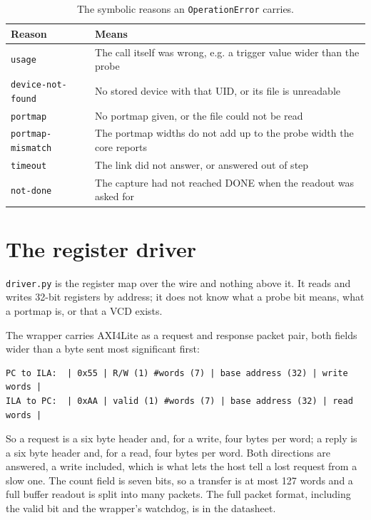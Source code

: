 \documentclass[../manual.tex]{subfiles}
\begin{document}
\begin{table}[H]
    \centering
    \begin{tabularx}{\textwidth}{|l|X|}
        \hline
        \rowcolor{gray!40} \textbf{Reason} & \textbf{Means} \\
        \hline
        \texttt{usage} & The call itself was wrong, e.g. a trigger value wider than the probe \\
        \hline
        \texttt{device-not-found} & No stored device with that UID, or its file is unreadable \\
        \hline
        \texttt{portmap} & No portmap given, or the file could not be read \\
        \hline
        \texttt{portmap-mismatch} & The portmap widths do not add up to the probe width the core reports \\
        \hline
        \texttt{timeout} & The link did not answer, or answered out of step \\
        \hline
        \texttt{not-done} & The capture had not reached DONE when the readout was asked for \\
        \hline
    \end{tabularx}
    \caption{The symbolic reasons an \texttt{OperationError} carries.}
    \label{tab:stack_reasons}
\end{table}

\section{The register driver}
\label{sec:stack_driver}

\texttt{driver.py} is the register map over the wire and nothing above it. It reads and writes 32-bit registers by address; it does not know what a probe bit means, what a portmap is, or that a VCD exists.

The wrapper carries AXI4Lite as a request and response packet pair, both fields wider than a byte sent most significant first:

\begin{lstlisting}
PC to ILA:  | 0x55 | R/W (1) #words (7) | base address (32) | write words |
ILA to PC:  | 0xAA | valid (1) #words (7) | base address (32) | read words |
\end{lstlisting}

So a request is a six byte header and, for a write, four bytes per word; a reply is a six byte header and, for a read, four bytes per word. Both directions are answered, a write included, which is what lets the host tell a lost request from a slow one. The count field is seven bits, so a transfer is at most 127 words and a full buffer readout is split into many packets. The full packet format, including the valid bit and the wrapper's watchdog, is in the datasheet.
\end{document}

